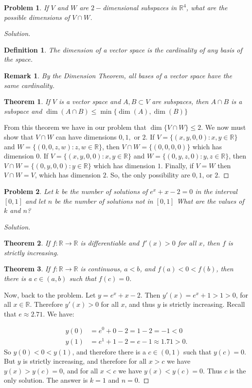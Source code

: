 \documentclass[oneside]{book}
\theoremstyle{mystyle}
\newtheorem{problem}{Problem}[section]
\newtheorem*{theorem*}{Theorem}
\newtheorem*{definition*}{Definition}
\newtheorem*{remark*}{Remark}
\begin{document}
\begin{problem}
If $V$ and $W$ are $2-$dimensional subspaces in $\mathbb{R}^4$, what are the possible dimensions of $V\cap W$.
\end{problem}
\begin{proof}[Solution]
\begin{definition*}
The dimension of a vector space is the cardinality of any basis of the space. 
\end{definition*}
\begin{remark*}
By the Dimension Theorem, all bases of a vector space have the same cardinality.
\end{remark*}
\begin{theorem*}
If $V$ is a vector space and $A,B\subset V$ are subspaces, then $A\cap B$ is a subspace and $\dim(A\cap B) \leq \min\{\dim(A),\dim(B)\}$
\end{theorem*}
From this theorem we have in our problem that $\dim\{V\cap W\} \leq 2$. We now must show that $V\cap W$ can have dimensions $0,1,$ or $2$. If $V = \{(x,y,0,0):x,y\in \mathbb{R}\}$ and $W = \{(0,0,z,w):z,w\in \mathbb{R}\}$, then $V\cap W = \{(0,0,0,0)\}$ which has dimension $0$. If $V = \{(x,y,0,0):x,y\in \mathbb{R}\}$ and $W = \{(0,y,z,0):y,z\in \mathbb{R}\}$, then $V\cap W = \{(0,y,0,0):y\in \mathbb{R}\}$ which has dimension $1$. Finally, if $V=W$ then $V\cap W = V$, which has dimension $2$. So, the only possibility are $0,1$, or $2$.
\end{proof}

\begin{problem}
Let $k$ be the number of solutions of $e^x+x-2 = 0$ in the interval $[0,1]$ and let $n$ be the number of solutions not in $[0,1]$ What are the values of $k$ and $n$?
\end{problem}
\begin{proof}[Solution]
\begin{theorem*}
If $f:\mathbb{R}\rightarrow \mathbb{R}$ is differentiable and $f'(x) >0$ for all $x$, then $f$ is strictly increasing.
\end{theorem*}
\begin{theorem*}
If $f:\mathbb{R}\rightarrow \mathbb{R}$ is continuous, $a<b$, and $f(a)<0<f(b)$, then there is a $c\in (a,b)$ such that $f(c) = 0$.
\end{theorem*}
Now, back to the problem. Let $y=e^x+x-2$. Then $y'(x) = e^x+1 > 1 > 0$, for all $x\in \mathbb{R}$. Therefore $y'(x)>0$ for all $x$, and thus $y$ is strictly increasing. Recall that $e\approx 2.71$. We have:

\begin{align}
    \nonumber y(0) &= e^0 + 0 - 2 = 1-2 = -1 <0 \\
    \nonumber y(1) &= e^1+1-2 = e-1 \approx 1.71 > 0.
\end{align}
So $y(0)<0<y(1)$, and therefore there is a $c\in (0,1)$ such that $y(c) = 0$. But $y$ is strictly increasing, and therefore for all $x>c$ we have $y(x)>y(c) = 0$, and for all $x<c$ we have $y(x)<y(c) = 0$. Thus $c$ is the only solution. The answer is $k=1$ and $n=0$.
\end{proof}
\end{document}
